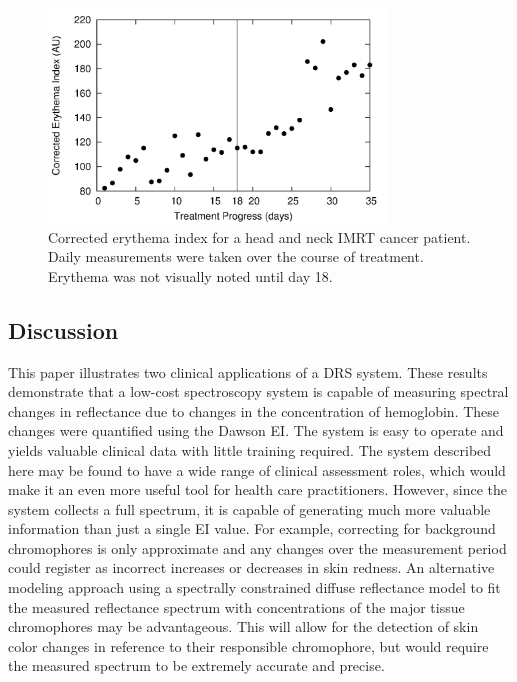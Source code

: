 \begin{figure}
	\centering \includegraphics[width=0.8\textwidth]{figures/p1-cor_ei.png}
	\caption[Corrected erythema index for IMRT cancer patient]{\label{fig:p1-cor_ei}Corrected erythema index for a head and neck IMRT cancer patient. Daily measurements were taken over the course of treatment. Erythema was not visually noted until day 18.}
\end{figure}

\subsection{Discussion}
This paper illustrates two clinical applications of a DRS system. These results demonstrate that a low-cost spectroscopy system is capable of measuring spectral changes in reflectance due to changes in the concentration of hemoglobin. These changes were quantified using the Dawson EI. The system is easy to operate and yields valuable clinical data with little training required. The system described here may be found to have a wide range of clinical assessment roles, which would make it an even more useful tool for health care practitioners. However, since the system collects a full spectrum, it is capable of generating much more valuable information than just a single EI value. For example, correcting for background chromophores is only approximate and any changes over the measurement period could register as incorrect increases or decreases in skin redness. An alternative modeling approach using a spectrally constrained diffuse reflectance model to fit the measured reflectance spectrum with concentrations of the major tissue chromophores may be advantageous. This will allow for the detection of skin color changes in reference to their responsible chromophore, but would require the measured spectrum to be extremely accurate and precise.

